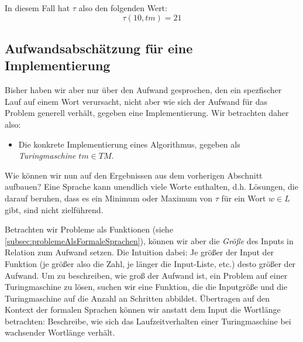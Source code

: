 In diesem Fall hat $\tau$ also den folgenden Wert:
\[
\tau(10,tm) = 21
\]

\subsection{Aufwandsabschätzung für eine Implementierung}

Bisher haben wir aber nur über den Aufwand gesprochen,
den ein spezfischer Lauf auf einem Wort verursacht,
nicht aber wie sich der Aufwand für das Problem generell verhält,
gegeben eine Implementierung.
Wir betrachten daher also:
\begin{itemize}
    \item Die konkrete Implementierung eines Algorithmus,
        gegeben als \emph{Turingmaschine $tm \in TM$}.
\end{itemize}

Wie können wir nun auf den Ergebnissen aus dem vorherigen Abschnitt aufbauen?
Eine Sprache kann unendlich viele Worte enthalten,
d.h. Lösungen, die darauf beruhen,
dass es ein Minimum oder Maximum von $\tau$ für ein Wort $w \in L$ gibt,
sind nicht zielführend.

Betrachten wir Probleme als Funktionen (siehe \autoref{subsec:problemeAlsFormaleSprachen}),
können wir aber die \emph{Größe} des Inputs in Relation zum Aufwand setzen.
Die Intuition dabei:
Je größer der Input der Funktion (je größer also die Zahl,
je länger die Input-Liste, etc.)
desto größer der Aufwand.
Um zu beschreiben,
wie groß der Aufwand ist,
ein Problem auf einer Turingmaschine zu lösen,
suchen wir eine Funktion,
die die Inputgröße und die Turingmaschine auf die Anzahl an Schritten abbildet.
Übertragen auf den Kontext der formalen Sprachen
können wir anstatt dem Input die Wortlänge betrachten:
Beschreibe, wie sich das Laufzeitverhalten einer Turingmaschine 
bei wachsender Wortlänge verhält.

